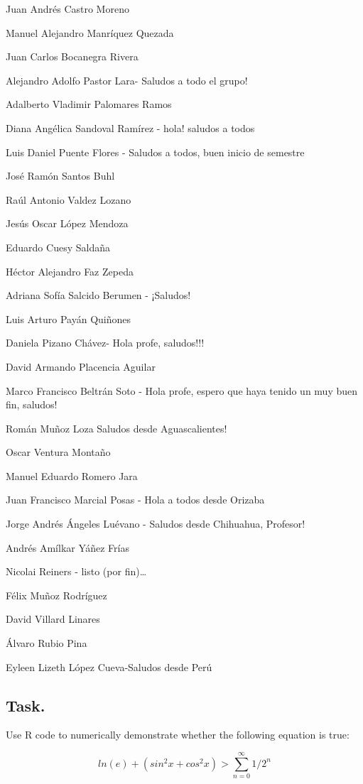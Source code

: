 \documentclass[12pt,halfline,a4paper,]{ouparticle}
\begin{document}
Juan Andrés Castro Moreno

Manuel Alejandro Manríquez Quezada

Juan Carlos Bocanegra Rivera

Alejandro Adolfo Pastor Lara- Saludos a todo el grupo!

Adalberto Vladimir Palomares Ramos

Diana Angélica Sandoval Ramírez - hola! saludos a todos

Luis Daniel Puente Flores - Saludos a todos, buen inicio de semestre

José Ramón Santos Buhl

Raúl Antonio Valdez Lozano

Jesús Oscar López Mendoza

Eduardo Cuesy Saldaña

Héctor Alejandro Faz Zepeda

Adriana Sofía Salcido Berumen - ¡Saludos!

Luis Arturo Payán Quiñones

Daniela Pizano Chávez- Hola profe, saludos!!!

David Armando Placencia Aguilar

Marco Francisco Beltrán Soto - Hola profe, espero que haya tenido un muy
buen fin, saludos!

Román Muñoz Loza Saludos desde Aguascalientes!

Oscar Ventura Montaño

Manuel Eduardo Romero Jara

Juan Francisco Marcial Posas - Hola a todos desde Orizaba

Jorge Andrés Ángeles Luévano - Saludos desde Chihuahua, Profesor!

Andrés Amílkar Yáñez Frías

Nicolai Reiners - listo (por fin)\ldots{}

Félix Muñoz Rodríguez

David Villard Linares

Álvaro Rubio Pina

Eyleen Lizeth López Cueva-Saludos desde Perú

\hypertarget{task.}{%
\subsection{Task.}\label{task.}}

Use R code to numerically demonstrate whether the following equation is
true:

\begin{equation}\label{eq:eq3}
ln(e)+(sin^2x+cos^2x) > \sum^{\infty}_{n=0}1/2^n
\end{equation}
\end{document}
